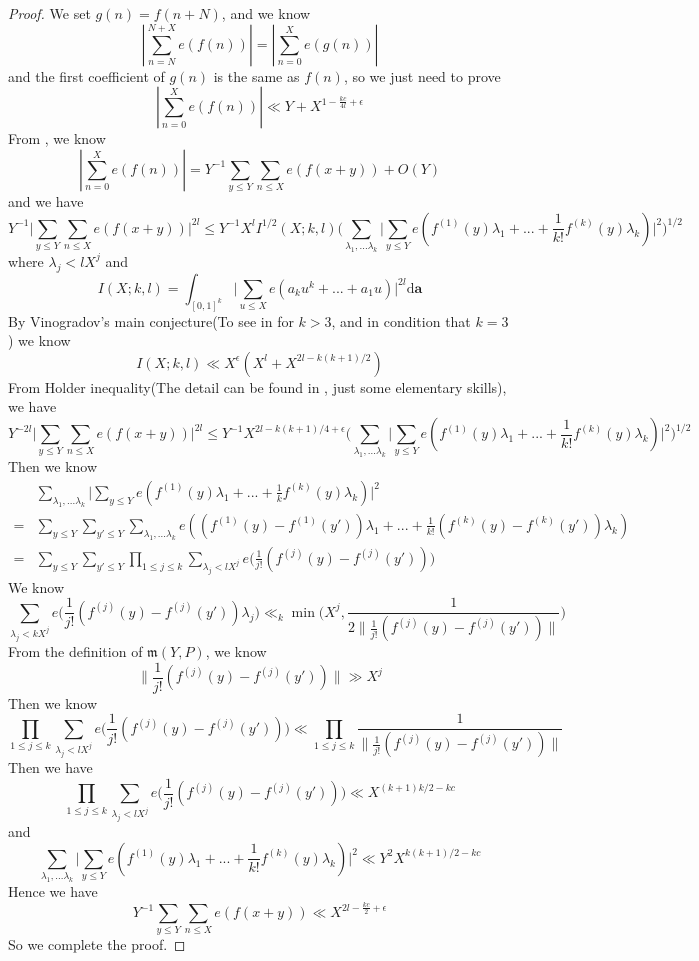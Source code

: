 \documentclass[10pt]{article}
\begin{document}
\begin{proof}
We set $g(n)=f(n+N)$, and we know
\[
|\sum\limits_{n=N}^{N+X}e(f(n))|=|\sum\limits_{n=0}^{X}e(g(n))|
\]
and the first coefficient of $g(n)$ is the same as $f(n)$, so we just need to prove
\[
|\sum\limits_{n=0}^{X}e(f(n))|\ll Y+X^{1-\frac{kc}{4l}+\epsilon}
\]
From \cite{PP1986}, we know 
\[
|\sum\limits_{n=0}^{X}e(f(n))|=Y^{-1}\sum\limits_{y\leq Y}\sum\limits_{n\leq X}e(f(x+y))+O(Y)
\]
and we have
\[
Y^{-1}\Big|\sum\limits_{y\leq Y}\sum\limits_{n\leq X}e(f(x+y))\Big|^{2l}\leq Y^{-1}X^lI^{1/2}(X;k,l)\Big(\sum\limits_{\lambda_1,...\lambda_k}\big|\sum\limits_{y\leq Y}e(f^{(1)}(y)\lambda_1+...+\frac{1}{k!}f^{(k)}(y)\lambda_k)\big|^2\Big)^{1/2}
\]
where $\lambda_j<lX^j$ and
\[
I(X;k,l)=\int_{[0,1]^k}\bigg|\sum\limits_{u\leq X}e(a_ku^k+...+a_1u)\bigg|^{2l}\mathrm{d}\textbf{a}
\]
By Vinogradov's main conjecture(To see in \cite{bourgain2016proofmainconjecturevinogradovs} for $k>3$, and \cite{wooley2014cubiccasemainconjecture} in condition that $k=3$) we know
\[
I(X;k,l)\ll X^{\epsilon}(X^{l}+X^{2l-k(k+1)/2})
\]
From Holder inequality(The detail can be found in \cite{PP1986}, just some elementary skills), we have
\[
Y^{-2l}\Big|\sum\limits_{y\leq Y}\sum\limits_{n\leq X}e(f(x+y))\Big|^{2l}\leq Y^{-1}X^{2l-k(k+1)/4+\epsilon}\Big(\sum\limits_{\lambda_1,...\lambda_k}\big|\sum\limits_{y\leq Y}e(f^{(1)}(y)\lambda_1+...+\frac{1}{k!}f^{(k)}(y)\lambda_k)\big|^2\Big)^{1/2}
\]
Then we know
\begin{align*}
&\sum\limits_{\lambda_1,...\lambda_k}\big|\sum\limits_{y\leq Y}e(f^{(1)}(y)\lambda_1+...+\frac{1}{k}f^{(k)}(y)\lambda_k)\big|^2\\
=&\sum\limits_{y\leq Y}\sum\limits_{y'\leq Y}\sum\limits_{\lambda_1,...\lambda_k}e((f^{(1)}(y)-f^{(1)}(y'))\lambda_1+...+\frac{1}{k!}(f^{(k)}(y)-f^{(k)}(y'))\lambda_k)\\
=&\sum\limits_{y\leq Y}\sum\limits_{y'\leq Y}\prod\limits_{1\leq j\leq k}\sum\limits_{\lambda_j<lX^j}e\big(\frac{1}{j!}(f^{(j)}(y)-f^{(j)}(y'))\big)
\end{align*}
We know
\[
\sum\limits_{\lambda_j<kX^j}e\big(\frac{1}{j!}(f^{(j)}(y)-f^{(j)}(y'))\lambda_j\big)\ll_k\min\bigg(X^j,\frac{1}{2\|\frac{1}{j!}(f^{(j)}(y)-f^{(j)}(y'))\|}\bigg)
\]
From the definition of $\mathfrak{m}(Y,P)$, we know
\[
\|\frac{1}{j!}(f^{(j)}(y)-f^{(j)}(y'))\|\gg X^{j}
\]
Then we know
\[
\prod\limits_{1\leq j\leq k}\sum\limits_{\lambda_j<lX^j}e\big(\frac{1}{j!}(f^{(j)}(y)-f^{(j)}(y'))\big)\ll\prod\limits_{1\leq j\leq k}\frac{1}{\|\frac{1}{j!}(f^{(j)}(y)-f^{(j)}(y'))\|}
\]
Then we have
\[
\prod\limits_{1\leq j\leq k}\sum\limits_{\lambda_j<lX^j}e\big(\frac{1}{j!}(f^{(j)}(y)-f^{(j)}(y'))\big)\ll X^{(k+1)k/2-kc}
\]
and
\[
\sum\limits_{\lambda_1,...\lambda_k}\big|\sum\limits_{y\leq Y}e(f^{(1)}(y)\lambda_1+...+\frac{1}{k!}f^{(k)}(y)\lambda_k)\big|^2\ll Y^2X^{k(k+1)/2-kc}
\]
Hence we have
\[
Y^{-1}\sum\limits_{y\leq Y}\sum\limits_{n\leq X}e(f(x+y))\ll X^{2l-\frac{kc}{2}+\epsilon}
\]
So we complete the proof.
\end{proof}
\end{document}
